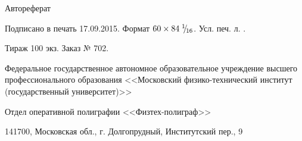 \clearpage

\phantom{top}
\vspace{0pt plus5fill} %
\begin{center}
\thesisAuthor
\end{center}

\vspace{0pt plus1fill}
\begin{center}
\large \thesisTitle
\vspace{0pt plus.5fill}
\large{Автореферат}
\end{center}

\vspace{0pt plus1fill}
\FPeval{}\FPeval{}
\begin{center}
Подписано в печать 17.09.2015. Формат $60 \times 84\; {}^{1}\mkern-5mu/{\!}_{16}$. Усл. печ. л. .

Тираж 100 экз. Заказ № 702.

Федеральное государственное автономное образовательное учреждение высшего профессионального образования
<<Московский физико-технический институт (государственный университет)>>

Отдел оперативной полиграфии <<Физтех-полиграф>>

141700, Московская обл., г. Долгопрудный, Институтский пер., 9
\end{center}

\vspace{0pt plus3fill}
\phantom{bottom}
